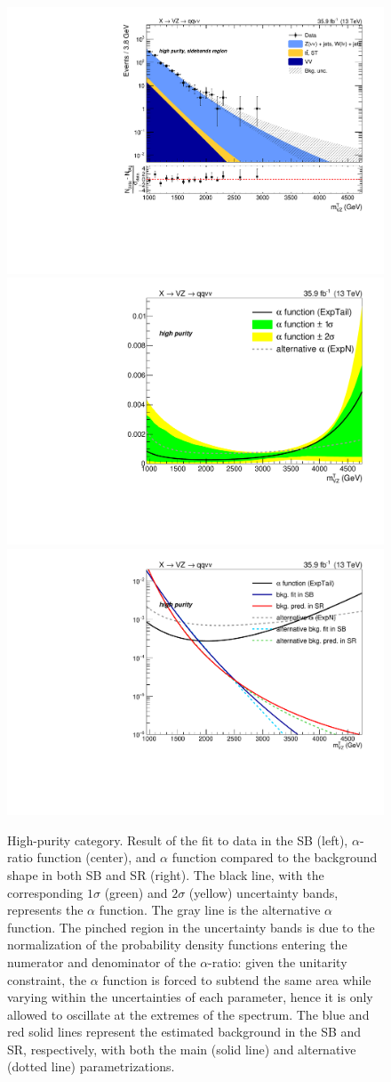 \begin{figure}[!htb]
  \centering
    \includegraphics[width=.33\textwidth]{plotsAlpha_tesi/XVZnnhp/BkgSB.pdf}
    \includegraphics[width=.33\textwidth]{plotsAlpha_tesi/XVZnnhp/AlphaRatio.pdf}
    \includegraphics[width=.33\textwidth]{plotsAlpha_tesi/XVZnnhp/AlphaMethod_log.pdf}
  \caption{High-purity category. Result of the fit to data in the SB (left), $\alpha$-ratio function (center), and $\alpha$ function compared to the background shape in both SB and SR (right). The black line, with the corresponding $1\sigma$ (green) and $2\sigma$ (yellow) uncertainty bands, represents the $\alpha$ function. The gray line is the alternative $\alpha$ function. The pinched region in the uncertainty bands is due to the normalization of the probability density functions entering the numerator and denominator of the $\alpha$-ratio: given the unitarity constraint, the $\alpha$ function is forced to subtend the same area while varying within the uncertainties of each parameter, hence it is only allowed to oscillate at the extremes of the spectrum. The blue and red solid lines represent the estimated background in the SB and SR, respectively, with both the main (solid line) and alternative (dotted line) parametrizations.}
  \label{fig:XVZnnhp_Alpha}
\end{figure}

